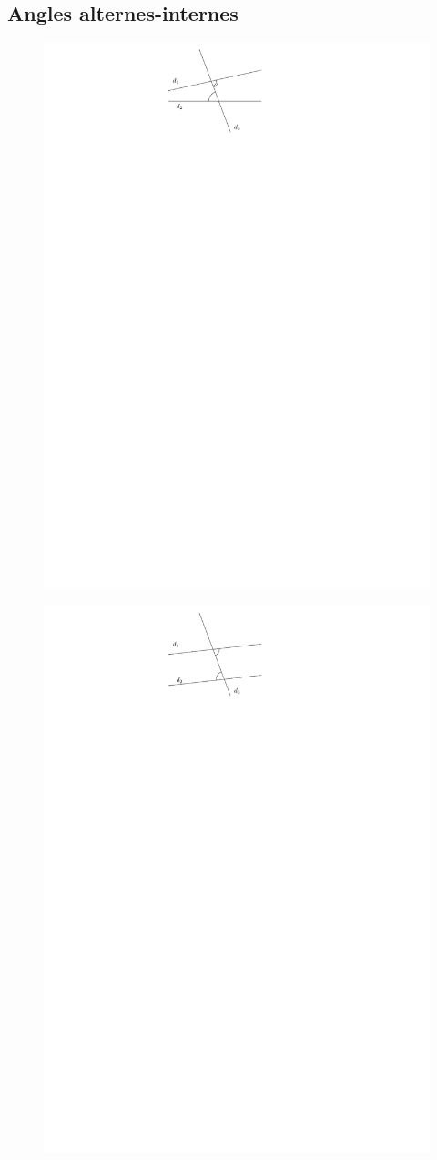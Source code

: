 \documentclass[12pt]{article}
\begin{document}
\subsection*{Angles alternes-internes}
\begin{multicols}{2}
  \begin{figure}[H]
    \centering
    \includegraphics[width=0.8\linewidth]{5x10-angles/sources/ai-1.pdf}
  \end{figure}
  \begin{figure}[H]
    \centering
    \includegraphics[width=0.8\linewidth]{5x10-angles/sources/ai-2.pdf}

\end{figure}
\end{multicols}
\end{document}
